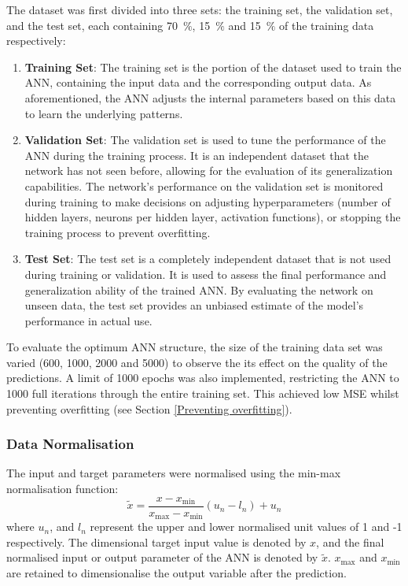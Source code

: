 The dataset was first divided into three sets: the training set, the validation set, and the test set, each containing 70~$\%$, 15~$\%$ and 15~$\%$ of the training data respectively:

\begin{enumerate}
	\item \textbf{Training Set}: The training set is the portion of the dataset used to train the ANN, containing the input data and the corresponding output data. As aforementioned, the ANN adjusts the internal parameters based on this data to learn the underlying patterns.
	\item \textbf{Validation Set}: The validation set is used to tune the performance of the ANN during the training process. It is an independent dataset that the network has not seen before, allowing for the evaluation of its generalization capabilities. The network's performance on the validation set is monitored during training to make decisions on adjusting hyperparameters (number of hidden layers, neurons per hidden layer, activation functions), or stopping the training process to prevent overfitting.
	\item \textbf{Test Set}: The test set is a completely independent dataset that is not used during training or validation. It is used to assess the final performance and generalization ability of the trained ANN. By evaluating the network on unseen data, the test set provides an unbiased estimate of the model's performance in actual use.
\end{enumerate}

To evaluate the optimum ANN structure, the size of the training data set was varied (600, 1000, 2000 and 5000) to observe the its effect on the quality of the predictions. A limit of 1000 epochs was also implemented, restricting the ANN to 1000 full iterations through the entire training set. This achieved low MSE whilst preventing overfitting (see Section \ref{Preventing overfitting}).

\subsubsection{Data Normalisation}

The input and target parameters were normalised using the min-max normalisation function:
\begin{equation}
	\tilde{x}=\frac{x-x_{\min }}{x_{\max }-x_{\min }}(u_n-l_n)+u_n
\end{equation}
where $u_n$, and $l_n$ represent the upper and lower normalised unit values of 1 and -1 respectively. The dimensional target input value is denoted by $x$, and the final normalised input or output parameter of the ANN is denoted by $\tilde{x}$. $x_{\max }$ and $x_{\min }$ are retained to dimensionalise the output variable after the prediction.

